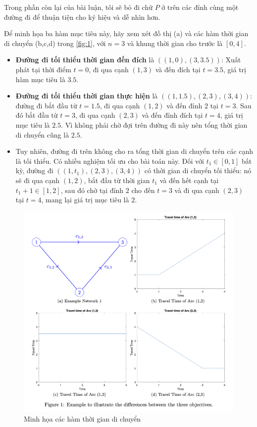 \documentclass[../main.tex]{subfiles}
\begin{document}
Trong phần còn lại của bài luận, tôi sẽ bỏ đi chữ \(P\) ở trên các đỉnh cùng một đường đi để thuận tiện cho ký hiệu và dễ nhìn
hơn.

Để minh họa ba hàm mục tiêu này, hãy xem xét đồ thị (a) và các hàm thời
gian di chuyển (b,c,d) trong \autoref{fig:1}, với \(n = 3\) và khung thời gian
cho trước là \([0, 4]\).

\begin{itemize}
\tightlist
\item
  \textbf{Đường đi tối thiểu thời gian đến đích} là
  \(((1, 0), (3, 3.5))\): Xuất phát tại thời điểm \(t = 0\), đi qua cạnh
  \((1, 3)\) và đến đích tại \(t = 3.5\), giá trị hàm mục tiêu là
  \(3.5\).
\item
  \textbf{Đường đi tối thiểu thời gian thực hiện} là
  \(((1, 1.5), (2, 3), (3, 4))\): đường đi bắt đầu từ \(t = 1.5\), đi
  qua cạnh \((1, 2)\) và đến đỉnh \(2\) tại \(t = 3\). Sau đó bắt đầu từ
  \(t = 3\), đi qua cạnh \((2, 3)\) và đến đỉnh đích tại \(t = 4\), giá
  trị mục tiêu là \(2.5\). Vì không phải chờ đợi trên đường đi này nên
  tổng thời gian di chuyển cũng là \(2.5\).
\item
  Tuy nhiên, đường đi trên không cho ra tổng thời gian di chuyển trên
  các cạnh là tối thiểu. Có nhiều nghiệm tối ưu cho bài toán này. Đối
  với \(t_1 \in [0, 1]\) bất kỳ, đường đi \(((1, t_1), (2, 3), (3, 4))\)
  có thời gian di chuyển tối thiểu: nó sẽ đi qua cạnh \((1, 2)\), bắt
  đầu từ thời gian \(t_1\) và đến hết cạnh tại \(t_1 + 1 \in [1, 2]\),
  sau đó chờ tại đỉnh \(2\) cho đến \(t = 3\) và đi qua cạnh \((2, 3)\)
  tại \(t = 4\), mang lại giá trị mục tiêu là \(2\).
\end{itemize}

\begin{figure}
\centering
\includegraphics{images/figure1.png}
\caption{Minh họa các hàm thời gian di chuyển}
\label{fig:1}
\end{figure}
\end{document}
